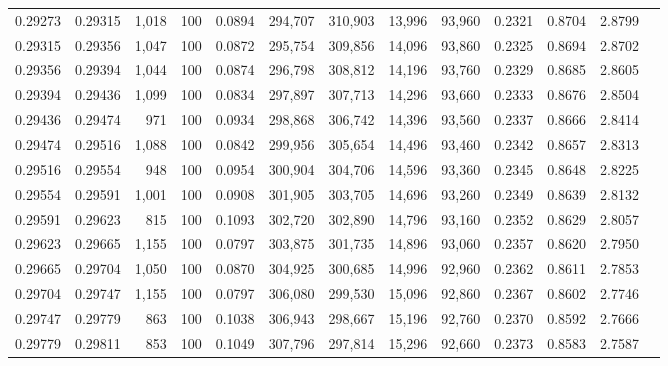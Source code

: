 \begin{tabular}{rrrrrrrrrrrrr}
0.29273 & 0.29315 &  1,018 & 100 &                                     0.0894 & 294,707 & 310,903 &  13,996 &  93,960 & 0.2321 & 0.8704 & 2.8799 \\
0.29315 & 0.29356 &  1,047 & 100 &                                     0.0872 & 295,754 & 309,856 &  14,096 &  93,860 & 0.2325 & 0.8694 & 2.8702 \\
0.29356 & 0.29394 &  1,044 & 100 &                                     0.0874 & 296,798 & 308,812 &  14,196 &  93,760 & 0.2329 & 0.8685 & 2.8605 \\
0.29394 & 0.29436 &  1,099 & 100 &                                     0.0834 & 297,897 & 307,713 &  14,296 &  93,660 & 0.2333 & 0.8676 & 2.8504 \\
0.29436 & 0.29474 &    971 & 100 &                                     0.0934 & 298,868 & 306,742 &  14,396 &  93,560 & 0.2337 & 0.8666 & 2.8414 \\
0.29474 & 0.29516 &  1,088 & 100 &                                     0.0842 & 299,956 & 305,654 &  14,496 &  93,460 & 0.2342 & 0.8657 & 2.8313 \\
0.29516 & 0.29554 &    948 & 100 &                                     0.0954 & 300,904 & 304,706 &  14,596 &  93,360 & 0.2345 & 0.8648 & 2.8225 \\
0.29554 & 0.29591 &  1,001 & 100 &                                     0.0908 & 301,905 & 303,705 &  14,696 &  93,260 & 0.2349 & 0.8639 & 2.8132 \\
0.29591 & 0.29623 &    815 & 100 &                                     0.1093 & 302,720 & 302,890 &  14,796 &  93,160 & 0.2352 & 0.8629 & 2.8057 \\
0.29623 & 0.29665 &  1,155 & 100 &                                     0.0797 & 303,875 & 301,735 &  14,896 &  93,060 & 0.2357 & 0.8620 & 2.7950 \\
0.29665 & 0.29704 &  1,050 & 100 &                                     0.0870 & 304,925 & 300,685 &  14,996 &  92,960 & 0.2362 & 0.8611 & 2.7853 \\
0.29704 & 0.29747 &  1,155 & 100 &                                     0.0797 & 306,080 & 299,530 &  15,096 &  92,860 & 0.2367 & 0.8602 & 2.7746 \\
0.29747 & 0.29779 &    863 & 100 &                                     0.1038 & 306,943 & 298,667 &  15,196 &  92,760 & 0.2370 & 0.8592 & 2.7666 \\
0.29779 & 0.29811 &    853 & 100 &                                     0.1049 & 307,796 & 297,814 &  15,296 &  92,660 & 0.2373 & 0.8583 & 2.7587 \\

\end{tabular}
